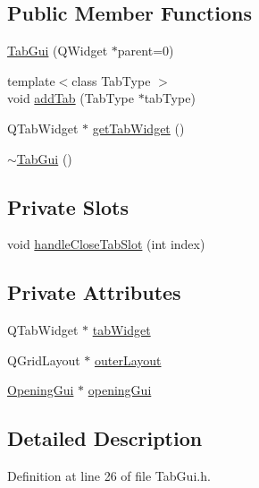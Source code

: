 \subsection*{Public Member Functions}
\begin{DoxyCompactItemize}
\item 
\hyperlink{class_tab_gui_a6ed13bb65c170b211011961f0bc7b89d}{Tab\-Gui} (Q\-Widget $\ast$parent=0)
\item 
{\footnotesize template$<$class Tab\-Type $>$ }\\void \hyperlink{class_tab_gui_a4051a0139cda9d91fc96b837d27b90d7}{add\-Tab} (Tab\-Type $\ast$tab\-Type)
\item 
Q\-Tab\-Widget $\ast$ \hyperlink{class_tab_gui_a9defb9e098e6da5c32a5c7aa15aa0fee}{get\-Tab\-Widget} ()
\item 
\hyperlink{class_tab_gui_a6bfb98f565ad1fd2dd2ea1785293fbdc}{$\sim$\-Tab\-Gui} ()
\end{DoxyCompactItemize}
\subsection*{Private Slots}
\begin{DoxyCompactItemize}
\item 
void \hyperlink{class_tab_gui_a16e228f9aefd7a1c4d59e0fd79e4b611}{handle\-Close\-Tab\-Slot} (int index)
\end{DoxyCompactItemize}
\subsection*{Private Attributes}
\begin{DoxyCompactItemize}
\item 
Q\-Tab\-Widget $\ast$ \hyperlink{class_tab_gui_ab036ccdd9eba80231890f11bff7557cc}{tab\-Widget}
\item 
Q\-Grid\-Layout $\ast$ \hyperlink{class_tab_gui_a6d33a663f8871b856495286a691a88f8}{outer\-Layout}
\item 
\hyperlink{class_opening_gui}{Opening\-Gui} $\ast$ \hyperlink{class_tab_gui_a2df2168c961cdd5cd29b96de3358f90b}{opening\-Gui}
\end{DoxyCompactItemize}


\subsection{Detailed Description}


Definition at line 26 of file Tab\-Gui.\-h.



